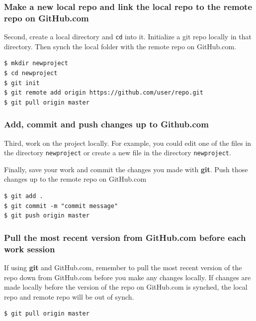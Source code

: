 \documentclass{book}
\begin{document}
\subsubsection{Make a new local repo and link the local repo to the
remote repo on
GitHub.com}\label{make-a-new-local-repo-and-link-the-local-repo-to-the-remote-repo-on-github.com}

Second, create a local directory and \lstinline!cd! into it. Initialize
a git repo locally in that directory. Then synch the local folder with
the remote repo on GitHub.com.

\begin{lstlisting}
$ mkdir newproject
$ cd newproject
$ git init
$ git remote add origin https://github.com/user/repo.git
$ git pull origin master
\end{lstlisting}

\subsubsection{Add, commit and push changes up to
Github.com}\label{add-commit-and-push-changes-up-to-github.com}

Third, work on the project locally. For example, you could edit one of
the files in the directory \lstinline!newproject! or create a new file
in the directory \lstinline!newproject!.

Finally, save your work and commit the changes you made with
\textbf{git}. Push those changes up to the remote repo on GitHub.com

\begin{lstlisting}
$ git add .
$ git commit -m "commit message"
$ git push origin master
\end{lstlisting}

\subsubsection{Pull the most recent version from GitHub.com before each
work
session}\label{pull-the-most-recent-version-from-github.com-before-each-work-session}

If using \textbf{git} and GitHub.com, remember to pull the most recent
version of the repo down from GitHub.com before you make any changes
locally. If changes are made locally before the version of the repo on
GitHub.com is synched, the local repo and remote repo will be out of
synch.

\begin{lstlisting}
$ git pull origin master
\end{lstlisting}
\end{document}
